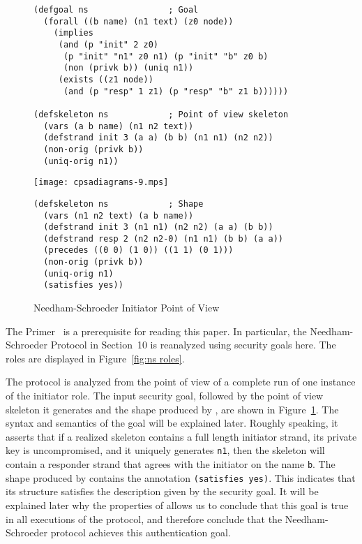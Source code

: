 \documentclass[12pt]{article}
\begin{document}
\begin{figure}
\begin{verbatim}
(defgoal ns                ; Goal
  (forall ((b name) (n1 text) (z0 node))
    (implies
     (and (p "init" 2 z0)
      (p "init" "n1" z0 n1) (p "init" "b" z0 b)
      (non (privk b)) (uniq n1))
     (exists ((z1 node))
      (and (p "resp" 1 z1) (p "resp" "b" z1 b))))))

(defskeleton ns            ; Point of view skeleton
  (vars (a b name) (n1 n2 text))
  (defstrand init 3 (a a) (b b) (n1 n1) (n2 n2))
  (non-orig (privk b))
  (uniq-orig n1))
\end{verbatim}
\begin{center}
\texttt{[image: cpsadiagrams-9.mps]}
\end{center}
\begin{verbatim}
(defskeleton ns            ; Shape
  (vars (n1 n2 text) (a b name))
  (defstrand init 3 (n1 n1) (n2 n2) (a a) (b b))
  (defstrand resp 2 (n2 n2-0) (n1 n1) (b b) (a a))
  (precedes ((0 0) (1 0)) ((1 1) (0 1)))
  (non-orig (privk b))
  (uniq-orig n1)
  (satisfies yes))
\end{verbatim}
\caption{Needham-Schroeder Initiator Point of View}
\label{fig:ns init}
\end{figure}

The {\cpsa} Primer~\cite{cpsaprimer09} is a prerequisite for reading
this paper.  In particular, the Needham-Schroeder Protocol in
Section~10 is reanalyzed using security goals here.  The roles are
displayed in Figure~\ref{fig:ns roles}.

The protocol is analyzed from the point of view of a complete run of
one instance of the initiator role.  The input security goal, followed
by the point of view skeleton it generates and the shape produced by
{\cpsa}, are shown in Figure~\ref{fig:ns init}.  The syntax and
semantics of the goal will be explained later.  Roughly speaking, it
asserts that if a realized skeleton contains a full length initiator
strand, its private key is uncompromised, and it uniquely generates
\texttt{n1}, then the skeleton will contain a responder strand that
agrees with the initiator on the name \texttt{b}.  The shape produced
by {\cpsa} contains the annotation \texttt{(satisfies yes)}.  This
indicates that its structure satisfies the description given by the
security goal.  It will be explained later why the properties of
{\cpsa} allows us to conclude that this goal is true in all executions
of the protocol, and therefore conclude that the Needham-Schroeder
protocol achieves this authentication goal.
\end{document}
